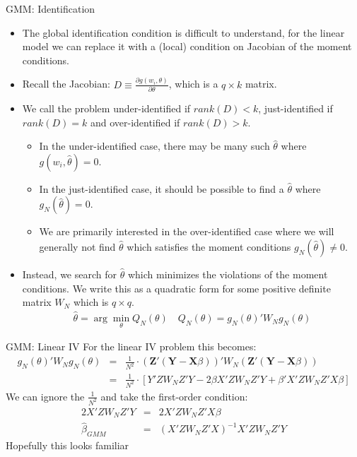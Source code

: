 \documentclass[aspectratio=169]{beamer}
\begin{document}
\begin{frame}{GMM: Identification}

\begin{itemize}
\item The global identification condition is difficult to understand, for the linear model we can replace it with a (local) condition on Jacobian of the moment conditions. 
\item Recall the Jacobian: $D \equiv \frac{\partial g(w_i,\theta)}{\partial \theta}$, which is a $q \times k$ matrix. 
\item We call the problem \alert{under-identified} if $rank(D) < k$, \alert{just-identified} if $rank(D) = k$ and \alert{over-identified} if $rank(D) > k$.
\begin{itemize}
\item In the under-identified case, there may be many such $\hat{\theta}$ where $g(w_i,\hat{\theta}) =0$.
\item In the just-identified case, it should be possible to find a $\hat{\theta}$ where $g_N(\hat{\theta})=0$. 
\item We are primarily interested in the over-identified case where we will generally not find $\hat{\theta}$ which satisfies the moment conditions $g_N(\hat{\theta})\neq0$.
\end{itemize}
\item Instead, we search for $\hat{\theta}$ which minimizes the violations of the moment conditions. We write this as a quadratic form for some positive definite matrix $W_N$ which is $q \times q$.
\begin{eqnarray*}
\hat{\theta} = \arg \min_{\theta}  Q_N(\theta) \quad Q_N(\theta)=g_N(\theta)' W_N  g_N(\theta)
\end{eqnarray*}
\end{itemize}
\end{frame}

\begin{frame}{GMM: Linear IV}
For the linear IV problem this becomes:
\begin{eqnarray*}
g_N(\theta)' W_N  g_N(\theta) &=& \frac{1}{N^2} \cdot (\mathbf{Z}' (\mathbf{Y} - \mathbf{X} \beta))' W_N (\mathbf{Z}' (\mathbf{Y} - \mathbf{X} \beta)) \\
&=& \frac{1}{N^2}\cdot [Y'Z W_N Z' Y - 2 \beta X' Z W_N Z' Y + \beta' X' Z W_N Z' X \beta]
\end{eqnarray*}
We can ignore the $\frac{1}{N^2}$ and take the first-order condition:
\begin{eqnarray*}
2 X'Z W_N Z' Y &=& 2 X'Z W_N Z' X \beta\\
\hat{\beta}_{GMM} &=& (X'Z W_N Z' X)^{-1} X' Z W_N Z'Y
\end{eqnarray*}
\alert{Hopefully this looks familiar}
\end{frame}
\end{document}
